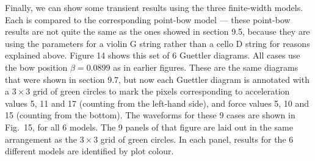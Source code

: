 







  Finally, we can show some transient results using the three finite-width 
  models. Each is compared to the corresponding point-bow model --- these 
  point-bow results are not quite the same as the ones showed in section 9.5, 
  because they are using the parameters for a violin G string rather than a 
  cello D string for reasons explained above. Figure 14 shows this set of 6 
  Guettler diagrams. All cases use the bow position $\beta = 0.0899$ as in 
  earlier figures. These are the same diagrams that were shown in section 9.7, 
  but now each Guettler diagram is annotated with a $3 \times 3$ grid of green 
  circles to mark the pixels corresponding to acceleration values 5, 11 and 17 
  (counting from the left-hand side), and force values 5, 10 and 15 (counting 
  from the bottom). The waveforms for these 9 cases are shown in Fig.\ 15, for 
  all 6 models. The 9 panels of that figure are laid out in the same 
  arrangement as the $3 \times 3$ grid of green circles. In each panel, results 
  for the 6 different models are identified by plot colour. 


